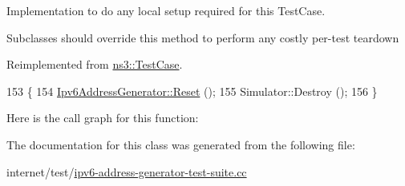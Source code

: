 Implementation to do any local setup required for this Test\+Case. 

Subclasses should override this method to perform any costly per-\/test teardown 

Reimplemented from \hyperlink{classns3_1_1TestCase_a8917f1604e28d312a8086f76291e3c46}{ns3\+::\+Test\+Case}.


\begin{DoxyCode}
153 \{
154   \hyperlink{group__config_ga2c1b65724f42f8c72276d7e7ad6df6db}{Ipv6AddressGenerator::Reset} ();
155   Simulator::Destroy ();
156 \}
\end{DoxyCode}


Here is the call graph for this function\+:




The documentation for this class was generated from the following file\+:\begin{DoxyCompactItemize}
\item 
internet/test/\hyperlink{ipv6-address-generator-test-suite_8cc}{ipv6-\/address-\/generator-\/test-\/suite.\+cc}\end{DoxyCompactItemize}
